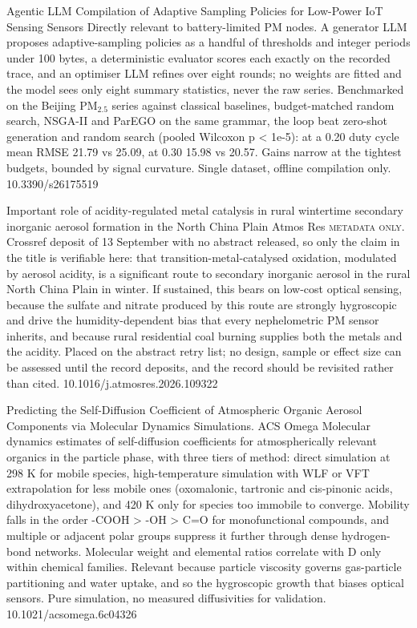\documentclass[10pt]{article}
\begin{document}
{Agentic LLM Compilation of Adaptive Sampling Policies for Low-Power IoT Sensing}
{Sensors}
{Directly relevant to battery-limited PM nodes. A generator LLM proposes adaptive-sampling policies as a handful of thresholds and integer periods under 100 bytes, a deterministic evaluator scores each exactly on the recorded trace, and an optimiser LLM refines over eight rounds; no weights are fitted and the model sees only eight summary statistics, never the raw series. Benchmarked on the Beijing PM$_{2.5}$ series against classical baselines, budget-matched random search, NSGA-II and ParEGO on the same grammar, the loop beat zero-shot generation and random search (pooled Wilcoxon p < 1e-5): at a 0.20 duty cycle mean RMSE 21.79 vs 25.09, at 0.30 15.98 vs 20.57. Gains narrow at the tightest budgets, bounded by signal curvature. Single dataset, offline compilation only.}
{10.3390/s26175519}

{Important role of acidity-regulated metal catalysis in rural wintertime secondary inorganic aerosol formation in the North China Plain}
{Atmos Res}
{\textsc{metadata only.} Crossref deposit of 13 September with no abstract released, so only the claim in the title is verifiable here: that transition-metal-catalysed oxidation, modulated by aerosol acidity, is a significant route to secondary inorganic aerosol in the rural North China Plain in winter. If sustained, this bears on low-cost optical sensing, because the sulfate and nitrate produced by this route are strongly hygroscopic and drive the humidity-dependent bias that every nephelometric PM sensor inherits, and because rural residential coal burning supplies both the metals and the acidity. Placed on the abstract retry list; no design, sample or effect size can be assessed until the record deposits, and the record should be revisited rather than cited.}
{10.1016/j.atmosres.2026.109322}

{Predicting the Self-Diffusion Coefficient of Atmospheric Organic Aerosol Components via Molecular Dynamics Simulations.}
{ACS Omega}
{Molecular dynamics estimates of self-diffusion coefficients for atmospherically relevant organics in the particle phase, with three tiers of method: direct simulation at 298 K for mobile species, high-temperature simulation with WLF or VFT extrapolation for less mobile ones (oxomalonic, tartronic and cis-pinonic acids, dihydroxyacetone), and 420 K only for species too immobile to converge. Mobility falls in the order -COOH > -OH > C=O for monofunctional compounds, and multiple or adjacent polar groups suppress it further through dense hydrogen-bond networks. Molecular weight and elemental ratios correlate with D only within chemical families. Relevant because particle viscosity governs gas-particle partitioning and water uptake, and so the hygroscopic growth that biases optical sensors. Pure simulation, no measured diffusivities for validation.}
{10.1021/acsomega.6c04326}
\end{document}
